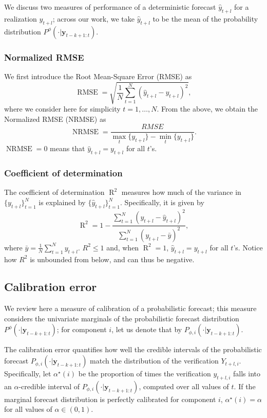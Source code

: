 \documentclass[twoside,11pt]{article}
\newcommand{\dobs}{y}
\newcommand{\ddobs}{\mathbf{y}}
\newcommand{\Dobs}{Y}
\newcommand{\probfor}{P^\phi(\cdot|\ddobs_{t-k+1:t})}
\begin{document}
	We discuss two measures of performance of a deterministic forecast $ \hat y_{t+l} $ for a realization $ y_{t+l} $; across our work, we take $ \hat y_{t+l}  $ to be the mean of the probability distribution $ \probfor $.
	
	
	
	\subsubsection{Normalized RMSE}
	We first introduce the Root Mean-Square Error (RMSE) as
	$$\operatorname{RMSE} =\sqrt{\frac{1}{N}\sum\limits_{t=1}^{N}\left(\hat y_{t+l} - y_{t+l} \right)^{2}},$$
	where we consider here for simplicity $ t=1, \ldots, N $. From the above, we obtain the Normalized RMSE (NRMSE) as
	$$\operatorname{NRMSE} = \frac{RMSE}{\max_t\{ y_{t+l} \} - \min_t\{ y_{t+l} \}}.$$
	$ \operatorname{NRMSE} =0 $ means that $ \hat y_{t+l} = y_{t+l} $ for all $ t $'s.
	
	\subsubsection{Coefficient of determination}
	The coefficient of determination $\operatorname{R}^2 $ measures how much of the variance in $ \{y_{t+l}\}_{t=1}^N $ is explained by $ \{\hat y_{t+l}\}_{t=1}^N $. Specifically, it is given by
	$$
	\operatorname{R}^{2}=1-\frac{\sum_{t=1}^{N} \left(y_{t+l}-\hat y_{t+l}\right)^{2}}{\sum_{t=1}^{N} \left(y_{t+l}-\bar{y} \right)^{2}},
	$$
	where $\bar{y} = \frac{1}{N} \sum\limits_{t=1}^{N} y_{t+l}$. $ R^2 \le 1$ and, when $ \operatorname{R}^{2}=1 $, $ \hat y_{t+l} = y_{t+l} $ for all $ t $'s. Notice how $ R^2 $ is unbounded from below, and can thus be negative.
	
	
	
	
	
	
	\subsection{Calibration error}
	
	We review here a measure of calibration of a probabilistic forecast; this measure considers the univariate marginals of the probabilistic forecast distribution $ \probfor $; for component $ i $, let us denote that by $ P_{\phi,i}(\cdot|\ddobs_{t-k+1:t}) $.
	
	
	
	
	
	
	The calibration error \citep{radev2020bayesflow} quantifies how well the credible intervals of the probabilistic forecast $ P_{\phi,i}(\cdot|\ddobs_{t-k+1:t}) $ match the distribution of the verification $ \Dobs_{t+l,i} $. Specifically, let $ \alpha^\star(i) $ be the proportion of times the verification $ \dobs_{t+l,i} $ falls into an $ \alpha $-credible interval of $ P_{\phi,i}(\cdot|\ddobs_{t-k+1:t}) $, computed over all values of $ t $. If the marginal forecast distribution is perfectly calibrated for component $ i $, $ \alpha^\star(i) =\alpha$ for all values of $ \alpha \in (0,1) $. 
	
\end{document}
